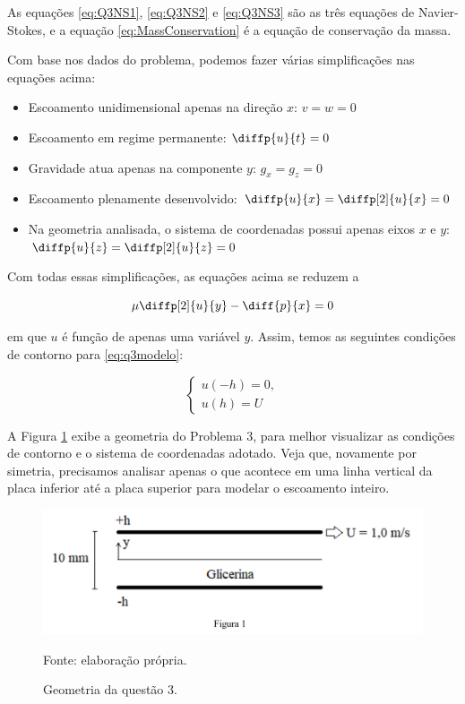 As equações \eqref{eq:Q3NS1}, \eqref{eq:Q3NS2} e \eqref{eq:Q3NS3} são as três 
equações de Navier-Stokes, e a equação \eqref{eq:MassConservation} é a equação de conservação
da massa.

Com base nos dados do problema, podemos fazer várias simplificações nas equações acima:

\begin{itemize}
    \item Escoamento unidimensional apenas na direção $x$: $v = w = 0$
    \item Escoamento em regime permanente: $\diffp{u}{t} = 0$
    \item Gravidade atua apenas na componente $y$: $g_x = g_z = 0$
    \item Escoamento plenamente desenvolvido: $\diffp{u}{x} = \diffp[2]{u}{x} = 0$
    \item Na geometria analisada, o sistema de coordenadas possui apenas eixos $x$ e $y$: 
    $\diffp{u}{z} = \diffp[2]{u}{z} = 0$ 
\end{itemize}

Com todas essas simplificações, as equações acima se reduzem a 

\begin{equation}\label{eq:q3modelo}
    \mu\diffp[2]{u}{y} - \diff{p}{x} = 0
\end{equation}

\noindent em que $u$ é função de apenas uma variável $y$.
Assim, temos as seguintes condições de contorno para \eqref{eq:q3modelo}:

\begin{equation}\label{eq:q3modeloContorno}
    \begin{cases}
        u(-h) = 0, \\
        u(h) = U
    \end{cases}
\end{equation}

A Figura \ref*{fig:geometriaQ3} exibe a geometria do Problema 3, para melhor visualizar as 
condições de contorno e o sistema de coordenadas adotado. Veja que, novamente por simetria,
precisamos analisar apenas o que acontece em uma linha vertical da placa inferior até a placa
superior para modelar o escoamento inteiro.

\begin{figure}[h!]
    \caption{Geometria da questão 3.}
    \label{fig:geometriaQ3}
    \centering
    \centerline{\includegraphics[scale=0.3]{geometriaQ3.png}}
    \par{Fonte: elaboração própria.}
\end{figure}


